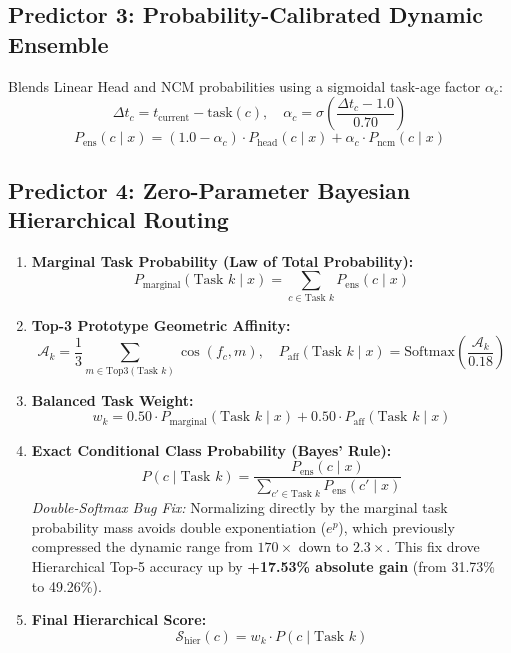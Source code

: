 \documentclass[11pt,a4paper]{article}
\begin{document}
\subsection{Predictor 3: Probability-Calibrated Dynamic Ensemble}
Blends Linear Head and NCM probabilities using a sigmoidal task-age factor $\alpha_c$:
\begin{equation}
\Delta t_c = t_{\text{current}} - \text{task}(c), \quad \alpha_c = \sigma\left(\frac{\Delta t_c - 1.0}{0.70}\right)
\end{equation}
\begin{equation}
P_{\text{ens}}(c \mid x) = (1.0 - \alpha_c) \cdot P_{\text{head}}(c \mid x) + \alpha_c \cdot P_{\text{ncm}}(c \mid x)
\end{equation}

\subsection{Predictor 4: Zero-Parameter Bayesian Hierarchical Routing}
\begin{enumerate}
    \item \textbf{Marginal Task Probability (Law of Total Probability):}
    \begin{equation}
    P_{\text{marginal}}(\text{Task } k \mid x) = \sum_{c \in \text{Task } k} P_{\text{ens}}(c \mid x)
    \end{equation}
    \item \textbf{Top-3 Prototype Geometric Affinity:}
    \begin{equation}
    \mathcal{A}_k = \frac{1}{3} \sum_{m \in \text{Top3}(\text{Task } k)} \cos(f_c, m), \quad P_{\text{aff}}(\text{Task } k \mid x) = \text{Softmax}\left(\frac{\mathcal{A}_k}{0.18}\right)
    \end{equation}
    \item \textbf{Balanced Task Weight:}
    \begin{equation}
    w_k = 0.50 \cdot P_{\text{marginal}}(\text{Task } k \mid x) + 0.50 \cdot P_{\text{aff}}(\text{Task } k \mid x)
    \end{equation}
    \item \textbf{Exact Conditional Class Probability (Bayes' Rule):}
    \begin{equation}
    P(c \mid \text{Task } k) = \frac{P_{\text{ens}}(c \mid x)}{\sum_{c' \in \text{Task } k} P_{\text{ens}}(c' \mid x)}
    \end{equation}
    \textit{Double-Softmax Bug Fix:} Normalizing directly by the marginal task probability mass avoids double exponentiation ($e^p$), which previously compressed the dynamic range from $170\times$ down to $2.3\times$. This fix drove Hierarchical Top-5 accuracy up by \textbf{+17.53\% absolute gain} (from 31.73\% to 49.26\%).
    \item \textbf{Final Hierarchical Score:}
    \begin{equation}
    \mathcal{S}_{\text{hier}}(c) = w_k \cdot P(c \mid \text{Task } k)
    \end{equation}
\end{enumerate}
\end{document}
